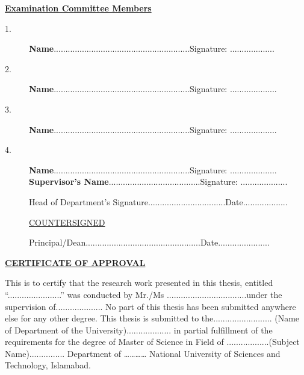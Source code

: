 \documentclass[a4paper, 12pt, twoside]{report}
\theoremstyle{definition}
\begin{document}
\begin{center}
\textbf{\underline{Examination Committee Members}}

\end{center}
\begin{description}
\item[1.] \textbf{Name}..........................................................Signature:  ...................\vskip 0.5cm
\item[2.] \textbf{Name}..........................................................Signature:  ....................\vskip 0.5cm
\item[3.] \textbf{Name}..........................................................Signature:  ....................\vskip 0.5cm
\item[4.] \textbf{Name}..........................................................Signature:  ....................\vskip 0.5cm
\textbf{Supervisor's Name}.......................................Signature:  ....................\vskip 1.5cm

Head of Department's Signature.................................Date...................\vskip 02cm
\begin{center}
\underline{COUNTERSIGNED}
\end{center}\vskip 1.5cm
Principal/Dean.................................................Date......................
\end{description}


\NoBgThispage
\newpage
{}
	\thispagestyle{empty}
\begin{center}
\textbf{\underline {CERTIFICATE OF APPROVAL}}
\end{center}

This is to certify that the research work presented in this thesis, entitled “.......................” was conducted by Mr./Ms ..................................under the supervision of....................
No part of this thesis has been submitted anywhere else for any other degree. This thesis is submitted to the......................... (Name of Department of the University)................... in partial fulfillment of the requirements for the degree of Master of Science in Field of ..................(Subject Name)...............
Department of ………… National University of Sciences and Technology, Islamabad.
\end{document}
